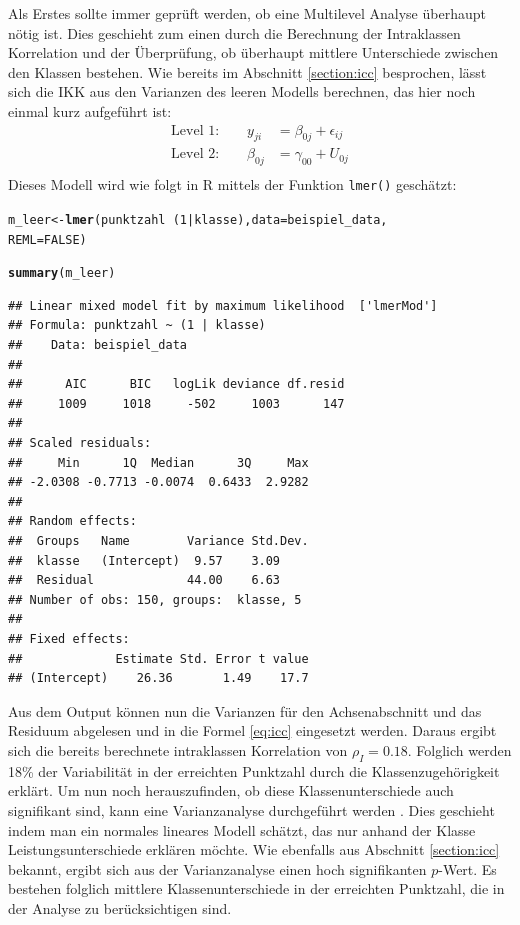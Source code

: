 \documentclass[12pt]{article}\usepackage[]{graphicx}\usepackage[]{color}
\makeatletter
\newcommand{\hlnum}[1]{\textcolor[rgb]{0.686,0.059,0.569}{#1}}%
\newcommand{\hlopt}[1]{\textcolor[rgb]{0,0,0}{#1}}%
\newcommand{\hlstd}[1]{\textcolor[rgb]{0.345,0.345,0.345}{#1}}%
\newcommand{\hlkwb}[1]{\textcolor[rgb]{0.69,0.353,0.396}{#1}}%
\newcommand{\hlkwc}[1]{\textcolor[rgb]{0.333,0.667,0.333}{#1}}%
\newcommand{\hlkwd}[1]{\textcolor[rgb]{0.737,0.353,0.396}{\textbf{#1}}}%
\newenvironment{kframe}{%
 \def\at@end@of@kframe{}%
 \ifinner\ifhmode%
  \def\at@end@of@kframe{\end{minipage}}%
  \begin{minipage}{\columnwidth}%
 \fi\fi%
 \def\FrameCommand##1{\hskip\@totalleftmargin \hskip-\fboxsep
 \colorbox{shadecolor}{##1}\hskip-\fboxsep
     \hskip-\linewidth \hskip-\@totalleftmargin \hskip\columnwidth}%
 \MakeFramed {\advance\hsize-\width
   \@totalleftmargin\z@ \linewidth\hsize
   \@setminipage}}%
 {\par\unskip\endMakeFramed%
 \at@end@of@kframe}
\newenvironment{knitrout}{}{} %
\makeatother
\begin{document}
Als Erstes sollte immer geprüft werden, ob eine Multilevel Analyse überhaupt nötig ist. Dies geschieht zum einen durch die Berechnung der Intraklassen Korrelation und der Überprüfung, ob überhaupt mittlere Unterschiede zwischen den Klassen bestehen. Wie bereits im Abschnitt \ref{section:icc} besprochen, lässt sich die IKK aus den Varianzen des leeren Modells berechnen, das hier noch einmal kurz aufgeführt ist:
\begin{equation}
\begin{split}	
 \text{Level 1:}  \qquad y_{ji} & = \beta_{0j} + \epsilon_{ij}\\
 \text{Level 2:} \qquad \beta_{0j} & = \gamma_{00} + U_{0j}\\
\end{split}	
\end{equation} 
Dieses Modell wird wie folgt in R mittels der Funktion \texttt{lmer()} geschätzt:

\singlespacing
\begin{knitrout}
\color{fgcolor}\begin{kframe}
\begin{alltt}
\hlstd{m_leer} \hlkwb{<-} \hlkwd{lmer}\hlstd{(punktzahl} \hlopt{~} \hlstd{(}\hlnum{1} \hlopt{|} \hlstd{klasse),} \hlkwc{data} \hlstd{= beispiel_data,}
    \hlkwc{REML} \hlstd{=} \hlnum{FALSE}\hlstd{)}

\hlkwd{summary}\hlstd{(m_leer)}
\end{alltt}
\begin{verbatim}
## Linear mixed model fit by maximum likelihood  ['lmerMod']
## Formula: punktzahl ~ (1 | klasse)
##    Data: beispiel_data
## 
##      AIC      BIC   logLik deviance df.resid 
##     1009     1018     -502     1003      147 
## 
## Scaled residuals: 
##     Min      1Q  Median      3Q     Max 
## -2.0308 -0.7713 -0.0074  0.6433  2.9282 
## 
## Random effects:
##  Groups   Name        Variance Std.Dev.
##  klasse   (Intercept)  9.57    3.09    
##  Residual             44.00    6.63    
## Number of obs: 150, groups:  klasse, 5
## 
## Fixed effects:
##             Estimate Std. Error t value
## (Intercept)    26.36       1.49    17.7
\end{verbatim}
\end{kframe}
\end{knitrout}

Aus dem Output können nun die Varianzen für den Achsenabschnitt und das Residuum abgelesen und in die Formel \eqref{eq:icc} eingesetzt werden. Daraus ergibt sich die bereits berechnete intraklassen Korrelation von $\rho_I = 0.18$. Folglich werden 18\% der Variabilität in der erreichten Punktzahl durch die Klassenzugehörigkeit erklärt. Um nun noch herauszufinden, ob diese Klassenunterschiede auch signifikant sind, kann eine Varianzanalyse durchgeführt werden \citep{SnijdersTomA.B2012Ma:a}. Dies geschieht indem man ein normales lineares Modell schätzt, das nur anhand der Klasse Leistungsunterschiede erklären möchte. Wie ebenfalls aus Abschnitt \ref{section:icc} bekannt, ergibt sich aus der Varianzanalyse einen hoch signifikanten $p$-Wert. Es bestehen folglich mittlere Klassenunterschiede in der erreichten Punktzahl, die in der Analyse zu berücksichtigen sind. 
\end{document}
